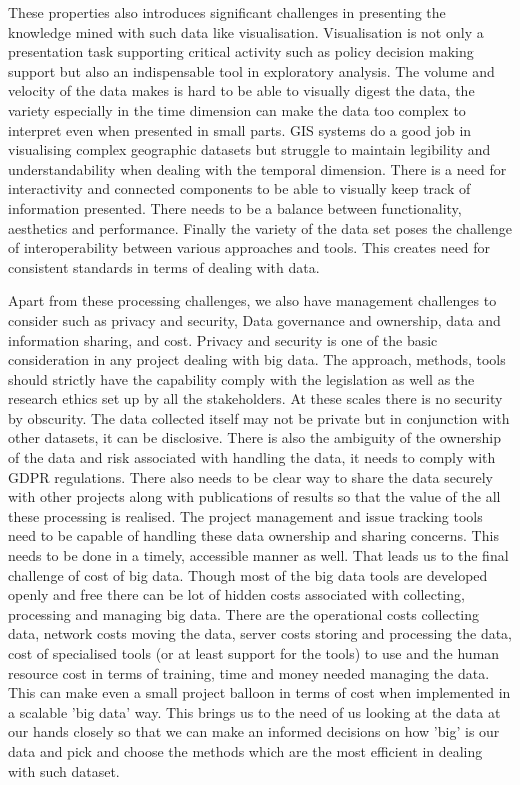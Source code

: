 These properties also introduces significant challenges in presenting the knowledge mined with such data like visualisation.
Visualisation is not only a presentation task supporting critical activity such as policy decision making support but also an indispensable tool in exploratory analysis.
The volume and velocity of the data makes is hard to be able to visually digest the data, the variety especially in the time dimension can make the data too complex to interpret even when presented in small parts.
GIS systems do a good job in visualising complex geographic datasets but struggle to maintain legibility and understandability when dealing with the temporal dimension.
There is a need for interactivity and connected components to be able to visually keep track of information presented.
There needs to be a balance between functionality, aesthetics and performance.
Finally the variety of the data set poses the challenge of interoperability between various approaches and tools.
This creates need for consistent standards in terms of dealing with data.


Apart from these processing challenges, we also have management challenges to consider such as privacy and security, Data governance and ownership, data and information sharing, and cost.
Privacy and security is one of the basic consideration in any project dealing with big data.
The approach, methods, tools should strictly have the capability comply with the legislation as well as the research ethics set up by all the stakeholders.
At these scales there is no security by obscurity.
The data collected itself may not be private but in conjunction with other datasets, it can be disclosive.
There is also the ambiguity of the ownership of the data and risk associated with handling the data, it needs to comply with GDPR regulations.
There also needs to be clear way to share the data securely with other projects along with publications of results so that the value of the all these processing is realised.
The project management and issue tracking tools need to be capable of handling these data ownership and sharing concerns.
This needs to be done in a timely, accessible manner as well.
That leads us to the final challenge of cost of big data.
Though most of the big data tools are developed openly and free there can be lot of hidden costs associated with collecting, processing and managing big data.
There are the operational costs collecting data, network costs moving the data, server costs storing and processing the data, cost of specialised tools (or at least support for the tools) to use and the human resource cost in terms of training, time and money needed managing the data.
This can make even a small project balloon in terms of cost when implemented in a scalable 'big data' way.
This brings us to the need of us looking at the data at our hands closely so that we can make an informed decisions on how 'big' is our data and pick and choose the methods which are the most efficient in dealing with such dataset.

